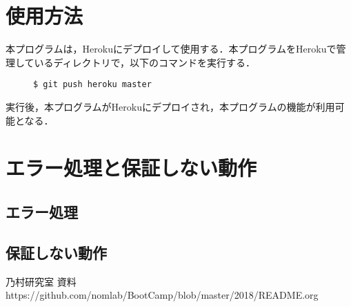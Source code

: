 \documentclass[12pt]{jsarticle}
\begin{document}
\section{使用方法}
本プログラムは，Herokuにデプロイして使用する．本プログラムをHerokuで管理しているディレクトリで，以下のコマンドを実行する．
\begin{description}
\item[] \verb|$ git push heroku master|
\end{description}
実行後，本プログラムがHerokuにデプロイされ，本プログラムの機能が利用可能となる．
\section{エラー処理と保証しない動作}
\subsection{エラー処理}

\subsection{保証しない動作}



\begin{thebibliography}{1}
   乃村研究室 資料　https:\slash{}\slash{}github.com\slash{}nomlab\slash{}BootCamp\slash{}blob\slash{}master\slash{}2018\slash{}README.org
\end{thebibliography}

%
%
\end{document}
